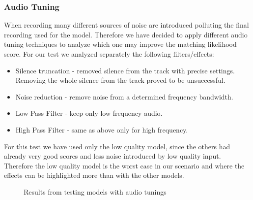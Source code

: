 \subsubsection{Audio Tuning}

When recording many different sources of noise are introduced polluting the final
recording used for the model. Therefore we have decided to apply different audio tuning
techniques to analyze which one may improve the matching likelihood score. For our test
we analyzed separately the following filters/effects:
\begin{itemize}
    \item Silence truncation - removed silence from the track with precise settings. Removing
    the whole silence from the track proved to be unsuccessful.
    \item Noise reduction - remove noise from a determined frequency bandwidth.
    \item Low Pass Filter - keep only low frequency audio.
    \item High Pass Filter - same as above only for high frequency.
\end{itemize}
For this test we have used only the low quality model, since the others had already very good scores
and less noise introduced by low quality input. Therefore the low quality model is the worst case in our scenario
and where the effects can be highlighted more than with the other models.
\begin{figure}
\begin{center}
\caption{Results from testing models with audio tunings}
\label{chart:score-tuning}
\end{center}
\end{figure}


